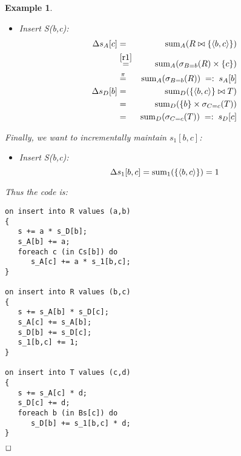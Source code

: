 \documentclass[10pt,twocolumn]{article}
\def\punto{$\hspace*{\fill}\Box$}
\newcommand{\tuple}[1]{{\langle#1\rangle}}
\newtheorem{example}[theorem]{Example}
\begin{document}
\begin{example}
\begin{itemize}
(Analogously insert T(c,d).)

\item
Insert S(b,c):
\begin{eqnarray*}
\Delta s_A[c] &=&
\algsum_{A}(R \bowtie \{\tuple{b,c}\})
\\ &\stackrel{\ref{r1}}{=}&
\algsum_{A}(\sigma_{B=b}(R) \times \{c\})
\\ &\stackrel{\pi}{=}&
\algsum_{A}(\sigma_{B=b}(R))
\;=:\; s_A[b]
\\
\Delta s_D[b] &=&
\algsum_{D}(\{\tuple{b,c}\} \bowtie T)
\\ &=&
\algsum_{D}(\{b\} \times \sigma_{C=c}(T))
\\ &=&
\algsum_{D}(\sigma_{C=c}(T))
\;=:\; s_D[c]
\end{eqnarray*}
\end{itemize}

Finally, we want to incrementally maintain $s_1[b,c]$:
\begin{itemize}
\item
Insert S(b,c):
\[
\Delta s_1[b,c] =
\algsum_{1}(\{\tuple{b,c}\}) = 1
\]
\end{itemize}

Thus the code is:
\begin{verbatim}
on insert into R values (a,b)
{
   s += a * s_D[b];
   s_A[b] += a;
   foreach c (in Cs[b]) do
      s_A[c] += a * s_1[b,c];
}

on insert into R values (b,c)
{
   s += s_A[b] * s_D[c];
   s_A[c] += s_A[b];
   s_D[b] += s_D[c];
   s_1[b,c] += 1;
}

on insert into T values (c,d)
{
   s += s_A[c] * d;
   s_D[c] += d;
   foreach b (in Bs[c]) do
      s_D[b] += s_1[b,c] * d;
}
\end{verbatim}
\punto
\end{example}
\end{document}
